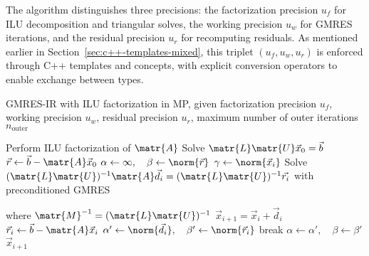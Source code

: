 The algorithm distinguishes three precisions: the factorization precision
\(u_f\) for ILU decomposition and triangular solves, the working precision
\(u_w\) for GMRES iterations, and the residual precision \(u_r\) for recomputing
residuals. As mentioned earlier in Section~\ref{sec:c++-templates-mixed}, this
triplet \((u_f, u_w, u_r)\) is enforced through C++ templates and concepts, with
explicit conversion operators to enable exchange between types.

\begin{singlespace}
  \begin{algorithm}[h]
    \caption{GMRES-IR with ILU factorization in MP, given factorization
      precision \(u_f\), working precision \(u_w\), residual precision \(u_r\),
      maximum number of outer iterations \(n_{\text{outer}}\)}
    \label{algo:ir}
    \begin{algorithmic}[1]
      \State Perform ILU factorization of \(\matr{A}\) 
      \State Solve \(\matr{L}\matr{U} \vec{x}_0 = \vec{b}\) 
      \State \(\vec{r} \gets \vec{b} - \matr{A}\vec{x}_0\) 
      \State \(\alpha \gets \infty, \quad \beta \gets \norm{\vec{r}}\)
        \State \(\gamma \gets \norm{\vec{x}_i}\)
        \State Solve \((\matr{L}\matr{U})^{-1}\matr{A}\vec{d}_i =
        (\matr{L}\matr{U})^{-1}\vec{r_i}\) with preconditioned GMRES \par
        where \(\matr{M}^{-1} = (\matr{L}\matr{U})^{-1}\) 
        \State \(\vec{x}_{i+1} = \vec{x}_i + \vec{d}_i\) 
        \State \(\vec{r}_i \gets \vec{b} - \matr{A}\vec{x}_i\) 
        \State \(\alpha' \gets \norm{\vec{d}_i}, \quad \beta' \gets \norm{\vec{r}_i}\)
          \State break
        \EndIf
        \State \(\alpha \gets \alpha', \quad \beta \gets \beta'\)
      \EndFor
      \State \Return \(\vec{x}_{i+1}\)
    \end{algorithmic}
  \end{algorithm}
\end{singlespace}
